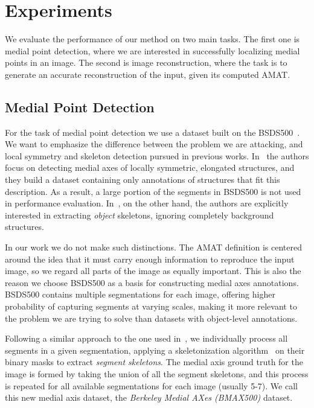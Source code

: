 \documentclass[10pt,twocolumn,letterpaper]{article}
\begin{document}
\section{Experiments}\label{sec:experiments}
We evaluate the performance of our method on two main tasks.
The first one is medial point detection, where we are interested in successfully localizing medial points
in an image.
The second is image reconstruction, where the task is to generate an accurate reconstruction of the input,
given its computed AMAT.
~

\subsection{Medial Point Detection}\label{sec:experiments:detection}
For the task of medial point detection we use a dataset built on the BSDS500~\cite{martin2001database,arbelaez2011contour}.
We want to emphasize the difference between the problem we are attacking, and local symmetry
and skeleton detection pursued in previous works.
In~\cite{tsogkas2012learning} the authors focus on detecting medial axes of locally symmetric, elongated structures,
and they build a dataset containing only annotations of structures that fit this description.
As a result, a large portion of the segments in BSDS500 is not used in performance evaluation.
In~\cite{shen2016object}, on the other hand, the authors are explicitly interested in extracting \emph{object}
skeletons, ignoring completely background structures.

In our work we do not make such distinctions. 
The AMAT definition is centered around the idea that it must carry enough information to reproduce the input image,
so we regard all parts of the image as equally important.
This is also the reason we choose BSDS500 as a basis for constructing medial axes annotations.
BSDS500 contains multiple segmentations for each image, offering higher probability of
capturing segments at varying scales, making it more relevant to the problem we are trying to solve
than datasets with object-level annotations.

Following a similar approach to the one used in~\cite{tsogkas2012learning,shen2016object}, 
we individually process all segments in a given segmentation, applying a skeletonization 
algorithm~\cite{telea2002augmented} on their binary masks to extract \emph{segment skeletons}.
The medial axis ground truth for the image is formed by taking the union of all the segment skeletons, and this
process is repeated for all available segmentations for each image (usually 5-7).
We call this new medial axis dataset, the \emph{Berkeley Medial AXes (BMAX500)} dataset.
\end{document}
